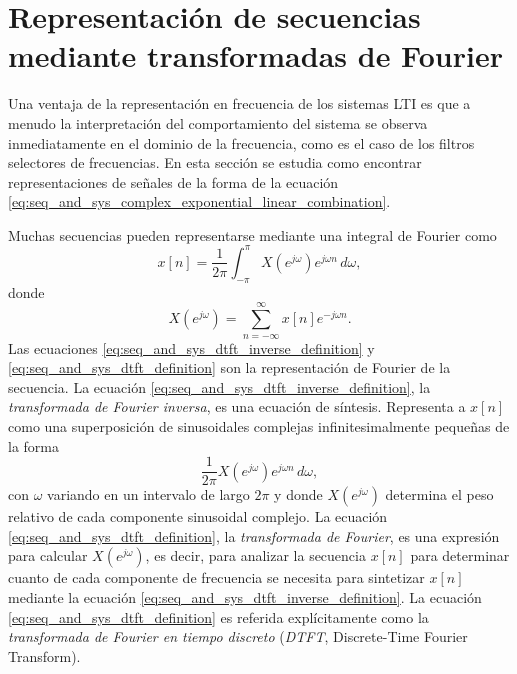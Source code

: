 \documentclass[a4paper]{report}
\begin{document}
\section{Representación de secuencias mediante transformadas de Fourier}\label{sec:seq_and_sys_fourier_transform_representation}

Una ventaja de la representación en frecuencia de los sistemas LTI es que a menudo la interpretación del comportamiento del sistema se observa inmediatamente en el dominio de la frecuencia, como es el caso de los filtros selectores de frecuencias. En esta sección se estudia como encontrar representaciones de señales de la forma de la ecuación \ref{eq:seq_and_sys_complex_exponential_linear_combination}.

Muchas secuencias pueden representarse mediante una integral de Fourier como
\begin{equation}\label{eq:seq_and_sys_dtft_inverse_definition}
 x[n]=\frac{1}{2\pi}\int_{-\pi}^\pi X(e^{j\omega})e^{j\omega n}\,d\omega,
\end{equation}
donde 
\begin{equation}\label{eq:seq_and_sys_dtft_definition}
 X(e^{j\omega})=\sum_{n=-\infty}^\infty x[n]e^{-j\omega n}.
\end{equation}
Las ecuaciones \ref{eq:seq_and_sys_dtft_inverse_definition} y \ref{eq:seq_and_sys_dtft_definition} son la representación de Fourier de la secuencia. La ecuación \ref{eq:seq_and_sys_dtft_inverse_definition}, la \emph{transformada de Fourier inversa}, es una ecuación de síntesis. Representa a \(x[n]\) como una superposición de sinusoidales complejas infinitesimalmente pequeñas de la forma
\[
 \frac{1}{2\pi}X(e^{j\omega})e^{j\omega n}\,d\omega,
\]
con \(\omega\) variando en un intervalo de largo \(2\pi\) y donde \(X(e^{j\omega})\) determina el peso relativo de cada componente sinusoidal complejo. La ecuación \ref{eq:seq_and_sys_dtft_definition}, la \emph{transformada de Fourier}, es una expresión para calcular \(X(e^{j\omega})\), es decir, para analizar la secuencia \(x[n]\) para determinar cuanto de cada componente de frecuencia se necesita para sintetizar \(x[n]\) mediante la ecuación \ref{eq:seq_and_sys_dtft_inverse_definition}. La ecuación \ref{eq:seq_and_sys_dtft_definition} es referida explícitamente como la \emph{transformada de Fourier en tiempo discreto} (\emph{DTFT}, Discrete-Time Fourier Transform).
\end{document}
